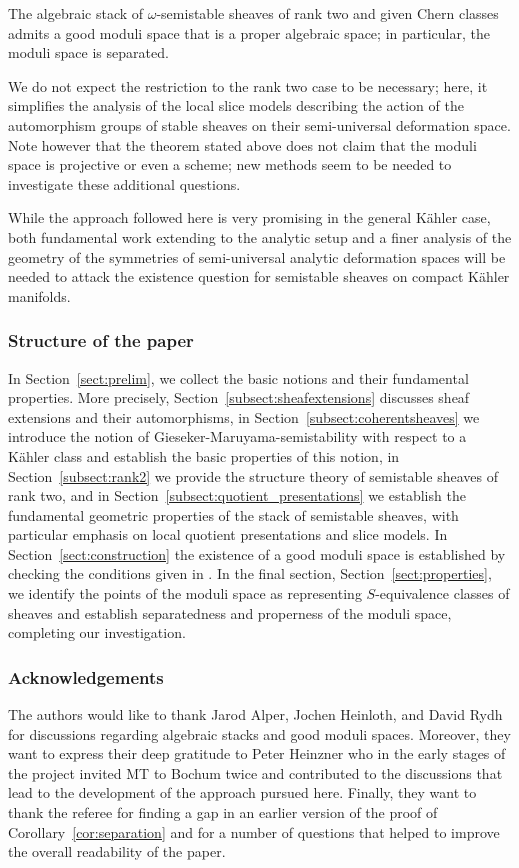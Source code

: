 \begin{thm*} The algebraic stack of $\omega$-semistable sheaves of rank two and given Chern classes admits a good moduli space that is a proper algebraic space; in particular, the moduli space is separated.
\end{thm*}

We do not expect the restriction to the rank two case to be necessary; here, it simplifies the analysis of the local slice models describing the action of the automorphism groups of stable sheaves on their semi-universal deformation space. Note however that the theorem stated above does not claim that the moduli space is projective or even a scheme; new methods seem to be needed to investigate these additional questions.

While the approach followed here is very promising in the general Kähler case, both fundamental work extending \cite{AlperFS} to the analytic setup and a finer analysis of the geometry of the symmetries of semi-universal analytic deformation spaces will be needed to attack the existence question for semistable sheaves on compact Kähler manifolds.

\subsubsection*{Structure of the paper}
In Section~\ref{sect:prelim}, we collect the basic notions and their fundamental properties. More precisely, Section~\ref{subsect:sheafextensions} discusses sheaf extensions and their automorphisms, in Section~\ref{subsect:coherentsheaves} we introduce the notion of Gieseker-Maruyama-semistability with respect to a Kähler class and establish the basic properties of this notion, in Section~\ref{subsect:rank2} we provide the structure theory of semistable sheaves of rank two, and in Section~\ref{subsect:quotient_presentations} we establish the fundamental geometric properties of the stack of semistable sheaves, with particular emphasis on local quotient presentations and slice models. In Section~\ref{sect:construction} the existence of a good moduli space is established by checking the conditions given in \cite[Th.\,1.2]{AlperFS}. In the final section, Section~\ref{sect:properties}, we identify the points of the moduli space as representing $S$-equivalence classes of sheaves and establish separatedness and properness of the moduli space, completing our investigation.

\subsubsection*{Acknowledgements}
The authors would like to thank Jarod Alper, Jochen Heinloth, and David Rydh for discussions regarding algebraic stacks and good moduli spaces. Moreover, they want to express their deep gratitude to Peter Heinzner who in the early stages of the project invited MT to Bochum twice and contributed to the discussions that lead to the development of the approach pursued here. Finally, they want to thank the referee for finding a gap in an earlier version of the proof of Corollary~\ref{cor:separation} and for a number of questions that helped to improve the overall readability of the paper.

